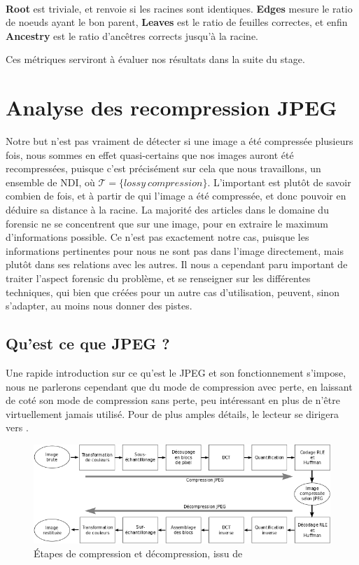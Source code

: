 \documentclass[utf8]{stageM2R} %
\begin{document}
\paragraph{}

\textbf{Root} est triviale, et renvoie si les racines sont identiques. \textbf{Edges} mesure le ratio de noeuds ayant le bon parent, \textbf{Leaves} est le ratio de feuilles correctes, et enfin \textbf{Ancestry} est le ratio d'ancêtres corrects jusqu'à la racine.

Ces métriques serviront à évaluer nos résultats dans la suite du stage.

\section{Analyse des recompression JPEG}
Notre but n'est pas vraiment de détecter si une image a été compressée plusieurs fois, nous sommes en effet quasi-certains que nos images auront été recompressées, puisque c'est précisément sur cela que nous travaillons, un ensemble de NDI, où $\mathcal{T} = {\{lossy\ compression\}}$. L'important est plutôt de savoir combien de fois, et à partir de qui l'image a été compressée, et donc pouvoir en déduire sa distance à la racine. La majorité des articles dans le domaine du forensic ne se concentrent que sur une image, pour en extraire le maximum d'informations possible. Ce n'est pas exactement notre cas, puisque les informations pertinentes pour nous ne sont pas dans l'image directement, mais plutôt dans ses relations avec les autres. Il nous a cependant paru important de traiter l'aspect forensic du problème, et se renseigner sur les différentes techniques, qui bien que créées pour un autre cas d'utilisation, peuvent, sinon s'adapter, au moins nous donner des pistes.

\subsection{Qu'est ce que JPEG ?}
Une rapide introduction sur ce qu'est le JPEG et son fonctionnement s'impose, nous ne parlerons cependant que du mode de compression avec perte, en laissant de coté son mode de compression sans perte, peu intéressant en plus de n'être virtuellement jamais utilisé. Pour de plus amples détails, le lecteur se dirigera vers \cite{wallace1992jpeg}.

\begin{figure}[H]
  \begin{center}
    \includegraphics[width=120mm]{images/jpeg.png}
    \caption{Étapes de compression et décompression, issu de \cite{jpeg}}
    \label{fig:jpeg}
  \end{center}
\end{figure}
\end{document}
